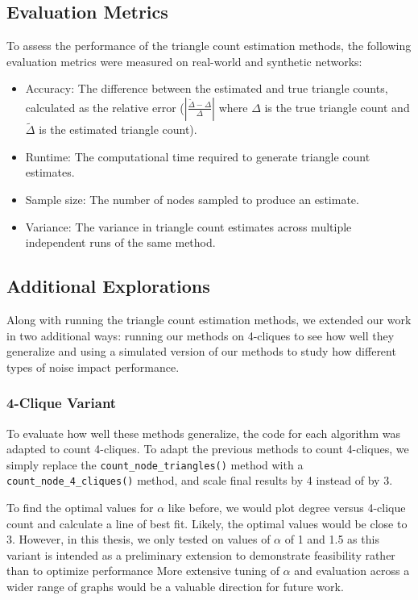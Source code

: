 \documentclass[11pt, margin=1in]{article}
\begin{document}
\subsection{Evaluation Metrics}

To assess the performance of the triangle count estimation methods, the following evaluation metrics were measured on real-world and synthetic networks:

\begin{itemize}
\item Accuracy: The difference between the estimated and true triangle counts, calculated as the relative error ($|\frac{\tilde{\Delta} - \Delta}{\Delta}|$ where $\Delta$ is the true triangle count and $\tilde{\Delta}$ is the estimated triangle count).
\item Runtime: The computational time required to generate triangle count estimates.
\item Sample size: The number of nodes sampled to produce an estimate.
\item Variance: The variance in triangle count estimates across multiple independent runs of the same method.
\end{itemize}

\subsection{Additional Explorations}

Along with running the triangle count estimation methods, we extended our work in two additional ways: running our methods on 4-cliques to see how well they generalize and using a simulated version of our methods to study how different types of noise impact performance.

\subsubsection{4-Clique Variant}

To evaluate how well these methods generalize, the code for each algorithm was adapted to count 4-cliques.
To adapt the previous methods to count 4-cliques, we simply replace the \lstinline{count_node_triangles()} method with a \lstinline{count_node_4_cliques()} method, and scale final results by 4 instead of by 3.

To find the optimal values for $\alpha$ like before, we would plot degree versus 4-clique count and calculate a line of best fit.
Likely, the optimal values would be close to 3.
However, in this thesis, we only tested on values of $\alpha$ of 1 and 1.5 as this variant is intended as a preliminary extension to demonstrate feasibility rather than to optimize performance
More extensive tuning of $\alpha$ and evaluation across a wider range of graphs would be a valuable direction for future work.
\end{document}
